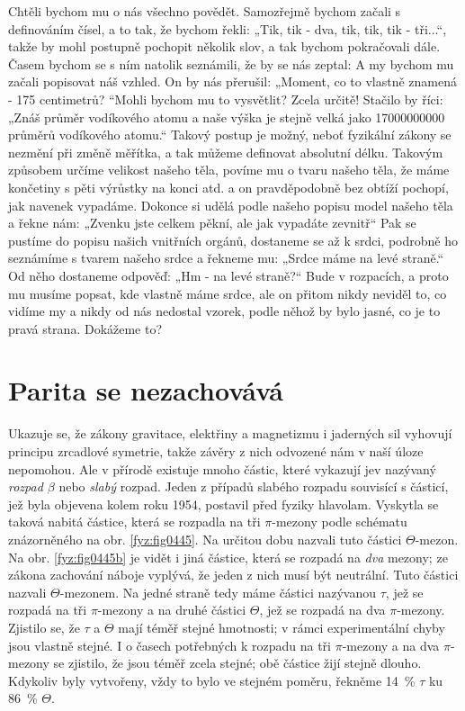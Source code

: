     Chtěli bychom mu o nás všechno povědět. Samozřejmě bychom začali s deﬁnováním čísel, a to tak,
    že bychom řekli: „Tik, tik - dva, tik, tik, tik - tři...“, takže by mohl postupně pochopit
    několik slov, a tak bychom pokračovali dále. Časem bychom se s ním natolik seznámili, že by se
    nás zeptal:  A my bychom mu začali popisovat náš vzhled.  On by nás přerušil: „Moment, co to vlastně znamená - 175 centimetrů?
    “Mohli bychom mu to vysvětlit? Zcela určitě! Stačilo by říci: „Znáš průměr vodíkového atomu a
    naše výška je stejně velká jako \num{17 000 000 000} průměrů vodíkového atomu.“ Takový postup je
    možný, neboť fyzikální zákony se nezmění při změně měřítka, a tak můžeme deﬁnovat absolutní
    délku. Takovým způsobem určíme velikost našeho těla, povíme mu o tvaru našeho těla, že máme
    končetiny s pěti výrůstky na konci atd. a on pravděpodobně bez obtíží pochopí, jak navenek
    vypadáme. Dokonce si udělá podle našeho popisu model našeho těla a řekne nám: „Zvenku jste
    celkem pěkní, ale jak vypadáte zevnitř“ Pak se pustíme do popisu našich vnitřních orgánů,
    dostaneme se až k srdci, podrobně ho seznámíme s tvarem našeho srdce a řekneme mu: „Srdce máme
    na levé straně.“ Od něho dostaneme odpověď: „Hm - na levé straně?“ Bude v rozpacích, a proto mu
    musíme popsat, kde vlastně máme srdce, ale on přitom nikdy neviděl to, co vidíme my a nikdy od
    nás nedostal vzorek, podle něhož by bylo jasné, co je to pravá strana. Dokážeme to?
  
  \section{Parita se nezachovává}\label{fyz:IchapLIIsecVII}
    Ukazuje se, že zákony gravitace, elektřiny a magnetizmu i jaderných sil vyhovují principu
    zrcadlové symetrie, takže závěry z nich odvozené nám v naší úloze nepomohou. Ale v přírodě
    existuje mnoho částic, které vykazují jev nazývaný \emph{rozpad \(\beta\)} nebo \emph{slabý}
    rozpad. Jeden z případů slabého rozpadu souvisící s částicí, jež byla objevena kolem roku 1954,
    postavil před fyziky hlavolam. Vyskytla se taková nabitá částice, která se rozpadla na tři
    \(\pi\)-mezony podle schématu znázorněného na obr. \ref{fyz:fig0445}. Na určitou dobu nazvali
    tuto částici \(\varTheta\)-mezon. Na obr. \ref{fyz:fig0445b} je vidět i jiná částice, která se
    rozpadá na \emph{dva} mezony; ze zákona zachování náboje vyplývá, že jeden z nich musí být
    neutrální. Tuto částici nazvali \(\varTheta\)-mezonem. Na jedné straně tedy máme částici
    nazývanou \(\tau\), jež se rozpadá na tři \(\pi\)-mezony a na druhé částici \(\varTheta\), jež
    se rozpadá na dva \(\pi\)-mezony. Zjistilo se, že \(\tau\) a \(\varTheta\) mají téměř stejné
    hmotnosti; v rámci experimentální chyby jsou vlastně stejné. I o časech potřebných k rozpadu na
    tři \(\pi\)-mezony a na dva \(\pi\)-mezony se zjistilo, že jsou téměř zcela stejné; obě částice
    žijí stejně dlouho. Kdykoliv byly vytvořeny, vždy to bylo ve stejném poměru, řekněme
    \SI{14}{\percent} \(\tau\) ku \SI{86}{\percent} \(\varTheta\).  
  
